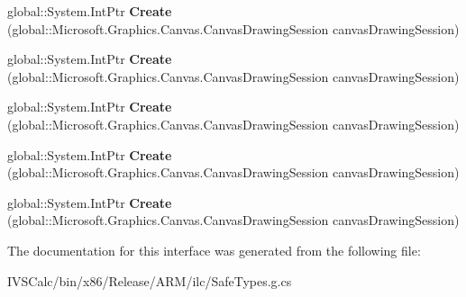 \begin{DoxyCompactItemize}
\item 
\mbox{\label{interface_microsoft_1_1_graphics_1_1_canvas_1_1_u_i_1_1_xaml_1_1_i_canvas_draw_event_args_factory_a030224626b28c2ece67ab0e5ea4a39c0}} 
global\+::\+System.\+Int\+Ptr {\bfseries Create} (global\+::\+Microsoft.\+Graphics.\+Canvas.\+Canvas\+Drawing\+Session canvas\+Drawing\+Session)
\item 
\mbox{\label{interface_microsoft_1_1_graphics_1_1_canvas_1_1_u_i_1_1_xaml_1_1_i_canvas_draw_event_args_factory_a030224626b28c2ece67ab0e5ea4a39c0}} 
global\+::\+System.\+Int\+Ptr {\bfseries Create} (global\+::\+Microsoft.\+Graphics.\+Canvas.\+Canvas\+Drawing\+Session canvas\+Drawing\+Session)
\item 
\mbox{\label{interface_microsoft_1_1_graphics_1_1_canvas_1_1_u_i_1_1_xaml_1_1_i_canvas_draw_event_args_factory_a030224626b28c2ece67ab0e5ea4a39c0}} 
global\+::\+System.\+Int\+Ptr {\bfseries Create} (global\+::\+Microsoft.\+Graphics.\+Canvas.\+Canvas\+Drawing\+Session canvas\+Drawing\+Session)
\item 
\mbox{\label{interface_microsoft_1_1_graphics_1_1_canvas_1_1_u_i_1_1_xaml_1_1_i_canvas_draw_event_args_factory_a030224626b28c2ece67ab0e5ea4a39c0}} 
global\+::\+System.\+Int\+Ptr {\bfseries Create} (global\+::\+Microsoft.\+Graphics.\+Canvas.\+Canvas\+Drawing\+Session canvas\+Drawing\+Session)
\item 
\mbox{\label{interface_microsoft_1_1_graphics_1_1_canvas_1_1_u_i_1_1_xaml_1_1_i_canvas_draw_event_args_factory_a030224626b28c2ece67ab0e5ea4a39c0}} 
global\+::\+System.\+Int\+Ptr {\bfseries Create} (global\+::\+Microsoft.\+Graphics.\+Canvas.\+Canvas\+Drawing\+Session canvas\+Drawing\+Session)
\end{DoxyCompactItemize}


The documentation for this interface was generated from the following file\+:\begin{DoxyCompactItemize}
\item 
I\+V\+S\+Calc/bin/x86/\+Release/\+A\+R\+M/ilc/Safe\+Types.\+g.\+cs\end{DoxyCompactItemize}
